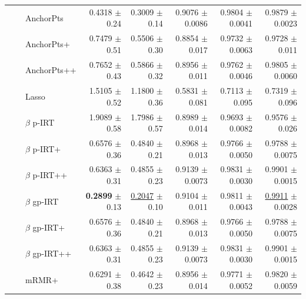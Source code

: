 \begin{longtable}{llp{}rrrrr}
 &  & AnchorPts & 0.4318 {\scriptsize $\pm$ 0.24} & 0.3009 {\scriptsize $\pm$ 0.14} & 0.9076 {\scriptsize $\pm$ 0.0086} & 0.9804 {\scriptsize $\pm$ 0.0041} & 0.9879 {\scriptsize $\pm$ 0.0023} \\
 &  & AnchorPts+ & 0.7479 {\scriptsize $\pm$ 0.51} & 0.5506 {\scriptsize $\pm$ 0.30} & 0.8854 {\scriptsize $\pm$ 0.017} & 0.9732 {\scriptsize $\pm$ 0.0063} & 0.9728 {\scriptsize $\pm$ 0.011} \\
 &  & AnchorPts++ & 0.7652 {\scriptsize $\pm$ 0.43} & 0.5866 {\scriptsize $\pm$ 0.32} & 0.8956 {\scriptsize $\pm$ 0.011} & 0.9762 {\scriptsize $\pm$ 0.0046} & 0.9805 {\scriptsize $\pm$ 0.0060} \\
 &  & Lasso & 1.5105 {\scriptsize $\pm$ 0.52} & 1.1800 {\scriptsize $\pm$ 0.36} & 0.5831 {\scriptsize $\pm$ 0.081} & 0.7113 {\scriptsize $\pm$ 0.095} & 0.7319 {\scriptsize $\pm$ 0.096} \\
 &  & $\beta$ p-IRT & 1.9089 {\scriptsize $\pm$ 0.58} & 1.7986 {\scriptsize $\pm$ 0.57} & 0.8989 {\scriptsize $\pm$ 0.014} & 0.9693 {\scriptsize $\pm$ 0.0082} & 0.9576 {\scriptsize $\pm$ 0.026} \\
 &  & $\beta$ p-IRT+ & 0.6576 {\scriptsize $\pm$ 0.36} & 0.4840 {\scriptsize $\pm$ 0.21} & 0.8968 {\scriptsize $\pm$ 0.013} & 0.9766 {\scriptsize $\pm$ 0.0050} & 0.9788 {\scriptsize $\pm$ 0.0075} \\
 &  & $\beta$ p-IRT++ & 0.6363 {\scriptsize $\pm$ 0.31} & 0.4855 {\scriptsize $\pm$ 0.23} & 0.9139 {\scriptsize $\pm$ 0.0073} & 0.9831 {\scriptsize $\pm$ 0.0030} & 0.9901 {\scriptsize $\pm$ 0.0015} \\
 &  & $\beta$ gp-IRT & \textbf{0.2899} {\scriptsize $\pm$ 0.13} & \underline{0.2047} {\scriptsize $\pm$ 0.10} & 0.9104 {\scriptsize $\pm$ 0.011} & 0.9811 {\scriptsize $\pm$ 0.0043} & \underline{0.9911} {\scriptsize $\pm$ 0.0028} \\
 &  & $\beta$ gp-IRT+ & 0.6576 {\scriptsize $\pm$ 0.36} & 0.4840 {\scriptsize $\pm$ 0.21} & 0.8968 {\scriptsize $\pm$ 0.013} & 0.9766 {\scriptsize $\pm$ 0.0050} & 0.9788 {\scriptsize $\pm$ 0.0075} \\
 &  & $\beta$ gp-IRT++ & 0.6363 {\scriptsize $\pm$ 0.31} & 0.4855 {\scriptsize $\pm$ 0.23} & 0.9139 {\scriptsize $\pm$ 0.0073} & 0.9831 {\scriptsize $\pm$ 0.0030} & 0.9901 {\scriptsize $\pm$ 0.0015} \\
 &  & mRMR+ & 0.6291 {\scriptsize $\pm$ 0.38} & 0.4642 {\scriptsize $\pm$ 0.23} & 0.8956 {\scriptsize $\pm$ 0.014} & 0.9771 {\scriptsize $\pm$ 0.0052} & 0.9820 {\scriptsize $\pm$ 0.0059} \\

\end{longtable}
